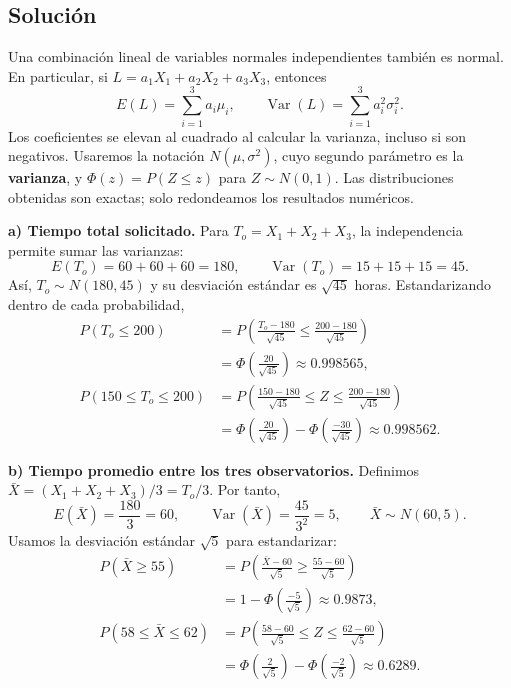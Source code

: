 \documentclass[a4paper]{article}
\begin{document}
\subsection{Solución}

Una combinación lineal de variables normales independientes también es normal. En particular, si $L=a_1X_1+a_2X_2+a_3X_3$, entonces
\[
E(L)=\sum_{i=1}^3 a_i\mu_i,
\qquad
\operatorname{Var}(L)=\sum_{i=1}^3 a_i^2\sigma_i^2.
\]
Los coeficientes se elevan al cuadrado al calcular la varianza, incluso si son negativos. Usaremos la notación $N(\mu,\sigma^2)$, cuyo segundo parámetro es la \textbf{varianza}, y $\Phi(z)=P(Z\le z)$ para $Z\sim N(0,1)$. Las distribuciones obtenidas son exactas; solo redondeamos los resultados numéricos.

\textbf{a) Tiempo total solicitado.}
Para $T_o=X_1+X_2+X_3$, la independencia permite sumar las varianzas:
\[
E(T_o)=60+60+60=180,\qquad
\operatorname{Var}(T_o)=15+15+15=45.
\]
Así, $T_o\sim N(180,45)$ y su desviación estándar es $\sqrt{45}$ horas. Estandarizando dentro de cada probabilidad,
\begin{align*}
P(T_o\le 200)
&=P\left(\frac{T_o-180}{\sqrt{45}}\le\frac{200-180}{\sqrt{45}}\right)\\
&=\Phi\left(\frac{20}{\sqrt{45}}\right)
\approx\boxed{0.998565},\\[4pt]
P(150\le T_o\le 200)
&=P\left(\frac{150-180}{\sqrt{45}}\le Z\le\frac{200-180}{\sqrt{45}}\right)\\
&=\Phi\left(\frac{20}{\sqrt{45}}\right)-\Phi\left(\frac{-30}{\sqrt{45}}\right)
\approx\boxed{0.998562}.
\end{align*}

\textbf{b) Tiempo promedio entre los tres observatorios.}
Definimos $\bar{X}=(X_1+X_2+X_3)/3=T_o/3$. Por tanto,
\[
E(\bar{X})=\frac{180}{3}=60,\qquad
\operatorname{Var}(\bar{X})=\frac{45}{3^2}=5,
\qquad \bar{X}\sim N(60,5).
\]
Usamos la desviación estándar $\sqrt{5}$ para estandarizar:
\begin{align*}
P(\bar{X}\ge 55)
&=P\left(\frac{\bar{X}-60}{\sqrt{5}}\ge\frac{55-60}{\sqrt{5}}\right)\\
&=1-\Phi\left(\frac{-5}{\sqrt{5}}\right)
\approx\boxed{0.9873},\\[4pt]
P(58\le\bar{X}\le 62)
&=P\left(\frac{58-60}{\sqrt{5}}\le Z\le\frac{62-60}{\sqrt{5}}\right)\\
&=\Phi\left(\frac{2}{\sqrt{5}}\right)-\Phi\left(\frac{-2}{\sqrt{5}}\right)
\approx\boxed{0.6289}.
\end{align*}
\end{document}
